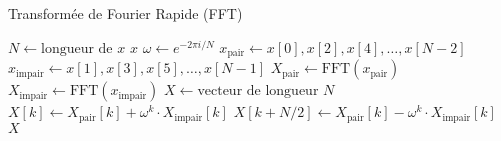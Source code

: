 \documentclass{article}
\begin{document}
\begin{algorithm}
\caption{Transformée de Fourier Rapide (FFT)}
\begin{algorithmic}[1]
    \State $N \gets \text{longueur de } x$
        \State \Return $x$
    \EndIf
    \State $\omega \gets e^{-2\pi i / N}$
    \State $x_{\text{pair}} \gets x[0], x[2], x[4], \ldots, x[N-2]$
    \State $x_{\text{impair}} \gets x[1], x[3], x[5], \ldots, x[N-1]$
    \State $X_{\text{pair}} \gets \text{FFT}(x_{\text{pair}})$
    \State $X_{\text{impair}} \gets \text{FFT}(x_{\text{impair}})$
    \State $X \gets \text{vecteur de longueur } N$
        \State $X[k] \gets X_{\text{pair}}[k] + \omega^k \cdot X_{\text{impair}}[k]$
        \State $X[k + N/2] \gets X_{\text{pair}}[k] - \omega^k \cdot X_{\text{impair}}[k]$
    \EndFor
    \State \Return $X$
\EndFunction
\end{algorithmic}
\end{algorithm}
\end{document}
